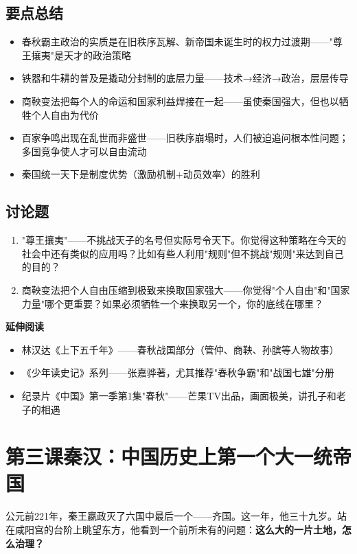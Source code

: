 \documentclass[a4paper,12pt]{ctexart}
\begin{document}
\subsection*{要点总结}
\begin{itemize}
  \item 春秋霸主政治的实质是在旧秩序瓦解、新帝国未诞生时的权力过渡期——"尊王攘夷"是天才的政治策略
  \item 铁器和牛耕的普及是撬动分封制的底层力量——技术→经济→政治，层层传导
  \item 商鞅变法把每个人的命运和国家利益焊接在一起——虽使秦国强大，但也以牺牲个人自由为代价
  \item 百家争鸣出现在乱世而非盛世——旧秩序崩塌时，人们被迫追问根本性问题；多国竞争使人才可以自由流动
  \item 秦国统一天下是制度优势（激励机制+动员效率）的胜利
\end{itemize}

\subsection*{讨论题}
\begin{enumerate}
  \item "尊王攘夷"——不挑战天子的名号但实际号令天下。你觉得这种策略在今天的社会中还有类似的应用吗？比如有些人利用"规则"但不挑战"规则"来达到自己的目的？
  \item 商鞅变法把个人自由压缩到极致来换取国家强大——你觉得"个人自由"和"国家力量"哪个更重要？如果必须牺牲一个来换取另一个，你的底线在哪里？
\end{enumerate}

\vspace{0.3cm}
\textcolor{blue!70!black}{\textbf{延伸阅读}}
\begin{itemize}
  \item 林汉达《上下五千年》——春秋战国部分（管仲、商鞅、孙膑等人物故事）
  \item 《少年读史记》系列——张嘉骅著，尤其推荐"春秋争霸"和"战国七雄"分册
  \item 纪录片《中国》第一季第1集"春秋"——芒果TV出品，画面极美，讲孔子和老子的相遇
\end{itemize}

\newpage

\section{\textcolor{orange!80!black}{第三课\quad 秦汉：中国历史上第一个大一统帝国}}

公元前221年，秦王嬴政灭了六国中最后一个——齐国。这一年，他三十九岁。站在咸阳宫的台阶上眺望东方，他看到一个前所未有的问题：\textbf{这么大的一片土地，怎么治理？}
\end{document}
